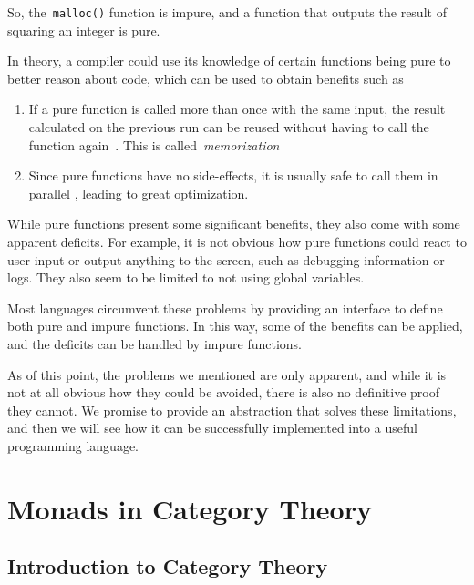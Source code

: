 \documentclass[a4paper]{article}
\theoremstyle{plain}
\theoremstyle{definition}
\begin{document}
So, the~\texttt{malloc()} function is impure, and a function that outputs
the result of squaring an integer is pure.

In theory, a compiler could use its knowledge of certain functions being pure to
better reason about code, which can be used to obtain benefits such as

\begin{enumerate}
    \item If a pure function is called more than once with the
        same input, the result calculated on the previous run can be reused
        without having to call the function again~\cite{frostMemorization}. This
        is called~\emph{memorization}

    \item Since pure functions have no side-effects, it is usually safe to call
        them in parallel \cite{SussPureFunctionParallelization}, leading to
        great optimization.
\end{enumerate}

While pure functions present some significant benefits, they also come with some
apparent deficits. For example, it is not obvious how pure functions could react
to user input or output anything to the screen, such as debugging information or
logs. They also seem to be limited to not using global variables.

Most languages circumvent these problems by providing an interface to define
both pure and impure functions. In this way, some of the benefits can be
applied, and the deficits can be handled by impure functions.

As of this point, the problems we mentioned are only apparent, and while it is
not at all obvious how they could be avoided, there is also no definitive proof
they cannot. We promise to provide an abstraction that solves these limitations,
and then we will see how it can be successfully implemented into a useful
programming language.

\section{Monads in Category Theory}
\subsection{Introduction to Category Theory}
\end{document}
